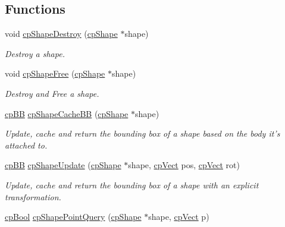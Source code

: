 \subsection*{Functions}
\begin{DoxyCompactItemize}
\item 
\hypertarget{group__cp_shape_gad4eff5be931cd7c3c5eaf9f431b73c9e}{void \hyperlink{group__cp_shape_gad4eff5be931cd7c3c5eaf9f431b73c9e}{cp\-Shape\-Destroy} (\hyperlink{structcp_shape}{cp\-Shape} $\ast$shape)}\label{group__cp_shape_gad4eff5be931cd7c3c5eaf9f431b73c9e}

\begin{DoxyCompactList}\small\item\em Destroy a shape. \end{DoxyCompactList}\item 
\hypertarget{group__cp_shape_ga5c1eff1ffaf87dda1890fa46ccba38b3}{void \hyperlink{group__cp_shape_ga5c1eff1ffaf87dda1890fa46ccba38b3}{cp\-Shape\-Free} (\hyperlink{structcp_shape}{cp\-Shape} $\ast$shape)}\label{group__cp_shape_ga5c1eff1ffaf87dda1890fa46ccba38b3}

\begin{DoxyCompactList}\small\item\em Destroy and Free a shape. \end{DoxyCompactList}\item 
\hypertarget{group__cp_shape_ga8cff320455af31adba99b4ff70e085a9}{\hyperlink{structcp_b_b}{cp\-B\-B} \hyperlink{group__cp_shape_ga8cff320455af31adba99b4ff70e085a9}{cp\-Shape\-Cache\-B\-B} (\hyperlink{structcp_shape}{cp\-Shape} $\ast$shape)}\label{group__cp_shape_ga8cff320455af31adba99b4ff70e085a9}

\begin{DoxyCompactList}\small\item\em Update, cache and return the bounding box of a shape based on the body it's attached to. \end{DoxyCompactList}\item 
\hypertarget{group__cp_shape_ga0b45787bf047be4d90b5d6e17d289151}{\hyperlink{structcp_b_b}{cp\-B\-B} \hyperlink{group__cp_shape_ga0b45787bf047be4d90b5d6e17d289151}{cp\-Shape\-Update} (\hyperlink{structcp_shape}{cp\-Shape} $\ast$shape, \hyperlink{structcp_vect}{cp\-Vect} pos, \hyperlink{structcp_vect}{cp\-Vect} rot)}\label{group__cp_shape_ga0b45787bf047be4d90b5d6e17d289151}

\begin{DoxyCompactList}\small\item\em Update, cache and return the bounding box of a shape with an explicit transformation. \end{DoxyCompactList}\item 
\hypertarget{group__cp_shape_ga2fedaf2576eadfdce6f717d8e7133e5f}{\hyperlink{group__basic_types_gab6e5d8afee598a57cd323abae5310244}{cp\-Bool} \hyperlink{group__cp_shape_ga2fedaf2576eadfdce6f717d8e7133e5f}{cp\-Shape\-Point\-Query} (\hyperlink{structcp_shape}{cp\-Shape} $\ast$shape, \hyperlink{structcp_vect}{cp\-Vect} p)}\label{group__cp_shape_ga2fedaf2576eadfdce6f717d8e7133e5f}


\end{DoxyCompactItemize}
